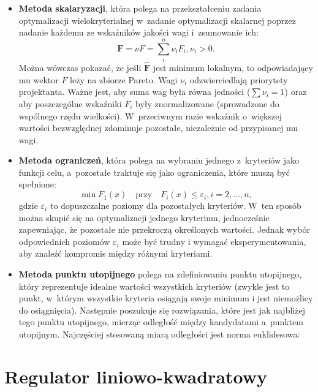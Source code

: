 \documentclass{article}
\begin{document}
    \begin{itemize}
        \item \textbf{Metoda skalaryzacji}, która polega na przekształceniu
        zadania optymalizacji wielokryterialnej w~zadanie optymalizacji
        skalarnej poprzez nadanie każdemu ze wskaźników jakości wagi i~zsumowanie ich:
        $$
            \mathbf{F} = \nu F = \sum_{i}^{n}\nu_{i}F_{i}, \nu_{i} > 0.
        $$
        Można wówczas pokazać, że jeśli $\hat{\textbf{F}}$ jest minimum lokalnym, to
        odpowiadający mu wektor $F$ leży na zbiorze Pareto.
        Wagi $\nu_{i}$ odzwierciedlają priorytety projektanta.
        Ważne jest, aby suma wag była równa jedności ($\sum\nu_{i} = 1$) oraz
        aby poszczególne wskaźniki $F_i$ były znormalizowane (sprowadzone
        do wspólnego rzędu wielkości). W~przeciwnym razie wskaźnik o~większej
        wartości bezwzględnej zdominuje pozostałe, niezależnie od przypisanej mu
        wagi.
        
        \item \textbf{Metoda ograniczeń}, która polega na wybraniu jednego
        z~kryteriów
        jako funkcji celu, a~pozostałe traktuje się jako ograniczenia, które muszą być spełnione:
        $$
            \min F_{1}(x) \quad \text{przy} \quad F_{i}(x) \leq \varepsilon_{i}, i = 2, \ldots, n,
        $$
        gdzie $\varepsilon_{i}$ to dopuszczalne poziomy dla pozostałych
        kryteriów. W~ten sposób
        można skupić się na optymalizacji jednego kryterium, jednocześnie
        zapewniając,
        że pozostałe nie przekroczą określonych wartości. Jednak wybór
        odpowiednich poziomów $\varepsilon_{i}$ może być trudny i wymagać
        eksperymentowania, aby znaleźć kompromis między różnymi kryteriami.

        \item \textbf{Metoda punktu utopijnego} polega na zdefiniowaniu
        punktu utopijnego, który reprezentuje idealne wartości wszystkich
        kryteriów (zwykle jest to punkt, w~którym wszystkie kryteria osiągają
        swoje minimum i jest niemożliey do osiągnięcia). Następnie poszukuje
        się rozwiązania, które jest jak najbliżej tego punktu utopijnego,
        mierząc odległość między kandydatami a~punktem utopijnym. Najczęściej
        stosowaną miarą odległości jest norma euklidesowa:
    \end{itemize} 

\section{Regulator liniowo-kwadratowy}
\end{document}
